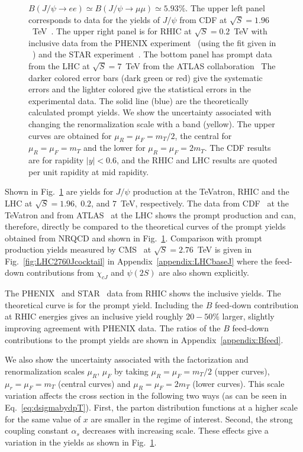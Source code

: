 \documentclass[article,showpacs,preprintnumbers,amsmath,amssymb]{revtex4}
\begin{document}
\begin{figure}[!ht]
{$B(J/\psi\rightarrow ee) \simeq B(J/\psi\rightarrow \mu\mu) \simeq 5.93\%$.
The upper left panel corresponds to data for the yields of $J/\psi$ from
CDF at $\sqrt{S}=1.96$~TeV~\cite{Acosta:2004yw}. The upper right panel is for
RHIC at $\sqrt{S}=0.2$~TeV with inclusive data from the PHENIX
experiment~\cite{Adare:2009js} (using the fit given in ~\cite{Adare:2009js}) and the STAR
experiment~\cite{Abelev:2009qaa}. The bottom panel has prompt data from the
LHC at $\sqrt{S}=7$~TeV from the ATLAS collaboration~\cite{Aad:2011sp}
The darker colored error bars (dark green or red) give the systematic
errors and the lighter colored give the statistical errors in the experimental
data. The solid line (blue) are the theoretically calculated prompt
yields. We show the uncertainty associated with changing the renormalization 
scale with a band (yellow). The upper curves are obtained for $\mu_R=\mu_F=m_T/2$,
the central for $\mu_R=\mu_F=m_T$ and the lower for $\mu_R=\mu_F=2m_T$. The CDF
results are for rapidity $|y|<0.6$, and the RHIC and LHC results are quoted per
unit rapidity at mid rapidity. \label{fig:Jyields}} 
\end{figure}


Shown in Fig.~\ref{fig:Jyields} are yields for $J/\psi$ production at the
TeVatron, RHIC and the LHC at $\sqrt{S}=1.96,\; 0.2$, and $7$~TeV,
respectively.  The data from CDF~\cite{Acosta:2004yw} at the TeVatron and from
ATLAS~\cite{Aad:2011sp}  at the LHC shows the prompt production and can,
therefore, directly be compared to the theoretical curves of the prompt yields
obtained from NRQCD and shown in Fig.~\ref{fig:Jyields}. Comparison with prompt
production yields measured by CMS~\cite{Chatrchyan:2012np} at $\sqrt{S} =
2.76$~TeV is given in Fig.~\ref{fig:LHC2760Jcocktail} in
Appendix~\ref{appendix:LHCbaseJ} where the feed-down contributions from
$\chi_{cJ}$ and $\psi(2S)$ are also shown explicitly.

The PHENIX~\cite{Adare:2009js} and STAR~\cite{Abelev:2009qaa} data from RHIC
shows the inclusive yields. The theoretical curve is for the prompt yield.
Including the $B$ feed-down contribution at RHIC energies gives an inclusive
yield roughly $20-50\%$ larger, slightly improving agreement with PHENIX data.
The ratios of the $B$ feed-down contributions to the prompt yields are shown in
Appendix~\ref{appendix:Bfeed}.

We also show the uncertainty associated with the factorization and renormalization 
scales $\mu_R$, $\mu_F$ by taking $\mu_R=\mu_F=m_T/2$ (upper curves),
$\mu_r=\mu_F=m_T$ (central curves) and $\mu_R=\mu_F=2m_T$ (lower curves). This
scale variation affects the cross section in the following two ways (as can be
seen in Eq.~\ref{eq:dsigmabydpT}). First, the parton distribution functions at
a higher scale for the same value of $x$ are smaller in the regime of interest.
Second, the strong coupling constant $\alpha_s$ decreases with increasing
scale. These effects give a variation in the yields as shown in
Fig.~\ref{fig:Jyields}.
\end{document}

